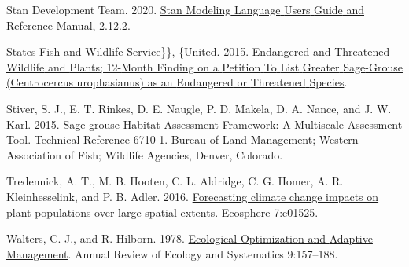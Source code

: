 \documentclass[
  12pt,
]{article}
\newlength{\cslhangindent}
\newlength{\cslentryspacingunit} %
\newenvironment{CSLReferences}[2] %
 {%
  \setlength{\parindent}{0pt}
  \ifodd #1
  \let\oldpar\par
  \def\par{\hangindent=\cslhangindent\oldpar}
  \fi
  \setlength{\parskip}{#2\cslentryspacingunit}
 }%
 {}
\begin{document}
\begin{CSLReferences}{1}{0}
\leavevmode{}%
Stan Development Team. 2020. \href{https://mc-stan.org}{Stan {Modeling} {Language} {Users} {Guide} and {Reference} {Manual}, 2.12.2}.

\leavevmode{}%
States Fish and Wildlife Service\}\}, \{United. 2015. \href{https://www.federalregister.gov/documents/2015/10/02/2015-24292/endangered-and-threatened-wildlife-and-plants-12-month-finding-on-a-petition-to-list-greater}{Endangered and {Threatened} {Wildlife} and {Plants}; 12-{Month} {Finding} on a {Petition} {To} {List} {Greater} {Sage}-{Grouse} ({Centrocercus} urophasianus) as an {Endangered} or {Threatened} {Species}}.

\leavevmode{}%
Stiver, S. J., E. T. Rinkes, D. E. Naugle, P. D. Makela, D. A. Nance, and J. W. Karl. 2015. Sage-grouse {Habitat} {Assessment} {Framework}: {A} {Multiscale} {Assessment} {Tool}. {Technical} {Reference} 6710-1. Bureau of Land Management; Western Association of Fish; Wildlife Agencies, Denver, Colorado.

\leavevmode{}%
Tredennick, A. T., M. B. Hooten, C. L. Aldridge, C. G. Homer, A. R. Kleinhesselink, and P. B. Adler. 2016. \href{https://doi.org/10.1002/ecs2.1525}{Forecasting climate change impacts on plant populations over large spatial extents}. Ecosphere 7:e01525.

\leavevmode{}%
Walters, C. J., and R. Hilborn. 1978. \href{https://doi.org/10.1146/annurev.es.09.110178.001105}{Ecological {Optimization} and {Adaptive} {Management}}. Annual Review of Ecology and Systematics 9:157--188.

\end{CSLReferences}
\end{document}
